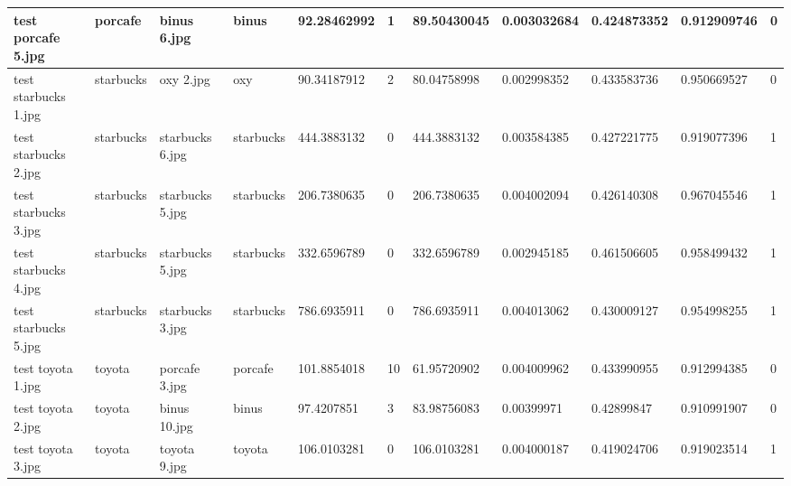 \begin{landscape}
\begin{longtable}{|p{2cm}|p{1.5cm}|p{2cm}|p{1.5cm}|p{2cm}|p{1cm}|p{2cm}|p{2cm}|p{2cm}|p{2cm}|p{1cm}|}
		test porcafe 5.jpg   & porcafe          & binus 6.jpg           & binus                       & 92.28462992           & 1                       & 89.50430045                & 0.003032684           & 0.424873352           & 0.912909746              & 0                \\ \hline
		test starbucks 1.jpg & starbucks        & oxy 2.jpg             & oxy                         & 90.34187912           & 2                       & 80.04758998                & 0.002998352           & 0.433583736           & 0.950669527              & 0                \\ \hline
		test starbucks 2.jpg & starbucks        & starbucks 6.jpg       & starbucks                   & 444.3883132           & 0                       & 444.3883132                & 0.003584385           & 0.427221775           & 0.919077396              & 1                \\ \hline
		test starbucks 3.jpg & starbucks        & starbucks 5.jpg       & starbucks                   & 206.7380635           & 0                       & 206.7380635                & 0.004002094           & 0.426140308           & 0.967045546              & 1                \\ \hline
		test starbucks 4.jpg & starbucks        & starbucks 5.jpg       & starbucks                   & 332.6596789           & 0                       & 332.6596789                & 0.002945185           & 0.461506605           & 0.958499432              & 1                \\ \hline
		test starbucks 5.jpg & starbucks        & starbucks 3.jpg       & starbucks                   & 786.6935911           & 0                       & 786.6935911                & 0.004013062           & 0.430009127           & 0.954998255              & 1                \\ \hline
		test toyota 1.jpg    & toyota           & porcafe 3.jpg         & porcafe                     & 101.8854018           & 10                      & 61.95720902                & 0.004009962           & 0.433990955           & 0.912994385              & 0                \\ \hline
		test toyota 2.jpg    & toyota           & binus 10.jpg          & binus                       & 97.4207851            & 3                       & 83.98756083                & 0.00399971            & 0.42899847            & 0.910991907              & 0                \\ \hline
		test toyota 3.jpg    & toyota           & toyota 9.jpg          & toyota                      & 106.0103281           & 0                       & 106.0103281                & 0.004000187           & 0.419024706           & 0.919023514              & 1                \\ \hline

\end{longtable}
\end{landscape}
